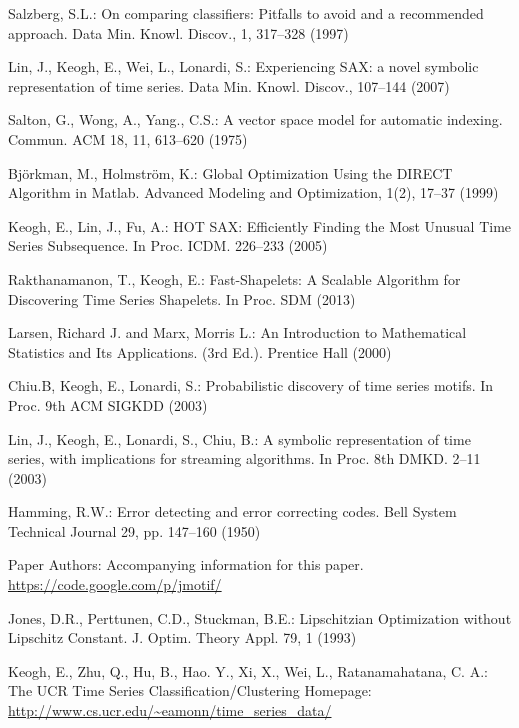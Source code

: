 \documentclass{llncs}
\begin{document}
\begin{thebibliography}{5}
Salzberg, S.L.:
On comparing classifiers: Pitfalls to avoid and a recommended approach. 
Data Min. Knowl. Discov., 1, 317--328 (1997)

Lin, J., Keogh, E., Wei, L., Lonardi, S.:
Experiencing SAX: a novel symbolic representation of time series.
Data Min. Knowl. Discov., 107--144 (2007)

Salton, G., Wong, A., Yang., C.S.:
A vector space model for automatic indexing. 
Commun. ACM 18, 11, 613--620 (1975)

Björkman, M., Holmström, K.:
Global Optimization Using the DIRECT Algorithm in Matlab.
Advanced Modeling and Optimization, 1(2), 17--37 (1999)

Keogh, E., Lin, J., Fu, A.:
HOT SAX: Efficiently Finding the Most Unusual Time Series Subsequence. 
In Proc. ICDM. 226--233 (2005)

Rakthanamanon, T., Keogh, E.:
Fast-Shapelets: A Scalable Algorithm for Discovering Time Series Shapelets.
In Proc. SDM (2013)

Larsen, Richard J. and Marx, Morris L.:
An Introduction to Mathematical Statistics and Its Applications. (3rd Ed.).
Prentice Hall (2000)


Chiu.B, Keogh, E., Lonardi, S.:
Probabilistic discovery of time series motifs. 
In Proc. 9th ACM SIGKDD (2003)

Lin, J., Keogh, E., Lonardi, S., Chiu, B.:
A symbolic representation of time series, with implications for streaming algorithms. 
In Proc. 8th DMKD. 2--11 (2003)

Hamming, R.W.:
Error detecting and error correcting codes. 
Bell System Technical Journal 29, pp. 147--160 (1950)

Paper Authors:
Accompanying information for this paper. 
\url{https://code.google.com/p/jmotif/}

Jones, D.R., Perttunen, C.D., Stuckman, B.E.:
Lipschitzian Optimization without Lipschitz Constant.
J. Optim. Theory Appl. 79, 1 (1993)

Keogh, E., Zhu, Q., Hu, B., Hao. Y.,  Xi, X., Wei, L., Ratanamahatana, C. A.:
The UCR Time Series Classification/Clustering Homepage:
\url{http://www.cs.ucr.edu/~eamonn/time_series_data/}


\end{thebibliography}
\end{document}
